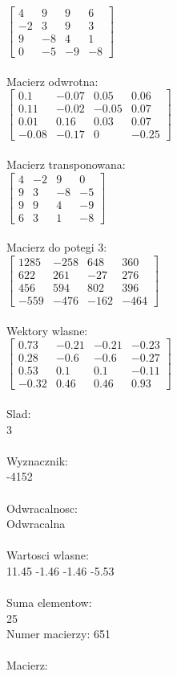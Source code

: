 \documentclass[a4paper,12pt]{article}
\begin{document}
$\begin{bmatrix} 4&9&9&6\\-2&3&9&3\\9&-8&4&1\\0&-5&-9&-8 \end{bmatrix}$
\\
\\
Macierz odwrotna:\\

$\begin{bmatrix} 0.1&-0.07&0.05&0.06\\0.11&-0.02&-0.05&0.07\\0.01&0.16&0.03&0.07\\-0.08&-0.17&0&-0.25 \end{bmatrix}$
\\
\\
Macierz transponowana:\\

$\begin{bmatrix} 4&-2&9&0\\9&3&-8&-5\\9&9&4&-9\\6&3&1&-8 \end{bmatrix}$
\\
\\
Macierz do potegi 3:\\

$\begin{bmatrix} 1285&-258&648&360\\622&261&-27&276\\456&594&802&396\\-559&-476&-162&-464 \end{bmatrix}$
\\
\\
Wektory wlasne:\\

$\begin{bmatrix} 0.73&-0.21&-0.21&-0.23\\0.28&-0.6&-0.6&-0.27\\0.53&0.1&0.1&-0.11\\-0.32&0.46&0.46&0.93 \end{bmatrix}$
\\
\\
Slad:\\
3
\\
\\
Wyznacznik:\\
-4152
\\
\\
Odwracalnosc:\\
Odwracalna
\\
\\
Wartosci wlasne:\\
11.45 -1.46 -1.46 -5.53
\\
\\
Suma elementow:\\
25
\\
\newpage
Numer macierzy:
651
\\
\\
Macierz:\\
\end{document}
